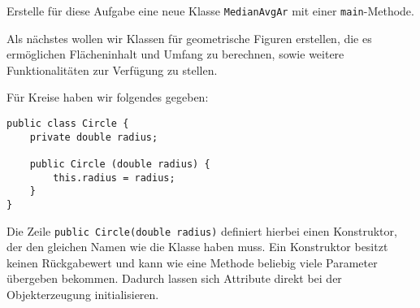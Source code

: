 \begin{questions}

Erstelle f\"ur diese    Aufgabe eine neue Klasse \texttt{MedianAvgAr} mit einer     \texttt{main}-Methode.



Als nächstes wollen wir Klassen für geometrische Figuren erstellen, die es ermöglichen Flächeninhalt und Umfang zu berechnen, sowie weitere Funktionalitäten zur Verfügung zu stellen.

Für Kreise haben wir folgendes gegeben:

\begin{lstlisting}
public class Circle {
    private double radius;

    public Circle (double radius) {
        this.radius = radius;
    }
}
\end{lstlisting}

Die Zeile \texttt{public Circle(double radius)} definiert hierbei einen Konstruktor, der den gleichen Namen wie die Klasse haben muss. Ein Konstruktor besitzt keinen Rückgabewert und kann wie eine Methode beliebig viele Parameter übergeben bekommen. Dadurch lassen sich Attribute direkt bei der Objekterzeugung initialisieren.


\end{questions}
